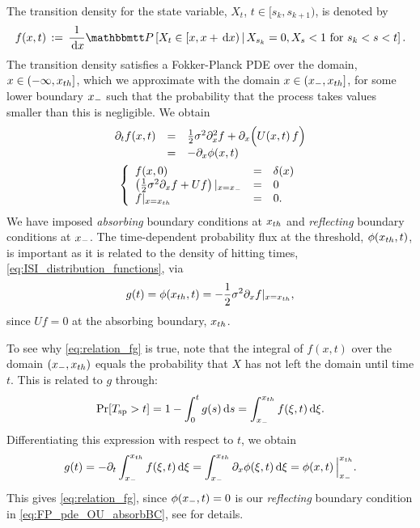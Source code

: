 The transition density for the state variable, $X_t$, $t \in [s_k, s_{k+1})$, is denoted by
\begin{equation}
f(x,t)  \, := \, \frac{1}{\intd{x} }\Prob \left[X_{t} \in [x, x+ \intd{x})  \,|\,
 X_{s_k} = 0, X_{s} < 1  \mbox{ for } s_k < s < t \right]  .
 \label{eq:transition_distribution}
\end{equation} 
The transition density satisfies a Fokker-Planck PDE over the domain, $x \in
(-\infty, { x_{th} }]$, which we approximate with the domain $x \in
({ x_{-} }, { x_{th} }]$, for some lower boundary ${ x_{-} }$ such that the
probability that the process takes values smaller than this is negligible. We
obtain
\begin{equation}
\begin{gathered}
\begin{array}{lcl}
	{\partial}_t f (x,t) &=&	\frac{1 }{2}\sigma^2  {\partial}^2_x f +
					{\partial}_x  \Big( U(x,t) \, f \Big)
					\\
					&=&
					- {\partial}_x \phi(x,t)
					\end{array}
	\\
	\left\{ \begin{array}{lcl}
	 f (x,0) &=& \delta(x)
	\\
	\left( \frac{1 }{2}\sigma^2 {\partial}_xf + U f \right) |_{x={ x_{-} }} &=& 0 
	\\
	f |_{x={ x_{th} }} &=& 0.
	\end{array} \right.
\label{eq:FP_pde_OU_absorbBC}
\end{gathered}
\end{equation}
We have imposed {\em absorbing} boundary conditions at ${ x_{th} }$ and {\em
reflecting} boundary conditions at ${ x_{-} }$.  The time-dependent probability flux at the
threshold, $\phi({ x_{th} }, t)$, is important as it is related to the density of hitting times,
\cref{eq:ISI_distribution_functions}, via 
\begin{equation}
\label{eq:relation_fg}
g(t)  = \phi({ x_{th} }, t) = -\frac{1 }{2}\sigma^2 {\partial}_x
f|_{x={ x_{th} }},
\end{equation}
since $U f = 0$ at the absorbing boundary, ${ x_{th} }$. 

To see why \cref{eq:relation_fg} is true, note that the integral of $f(x,t)$
over the domain $({ x_{-} }, { x_{th} })$ equals the probability that $X$ has
not left the domain until time $t$. This is related to $g$ through: 
$$\Pr[{ T_{\textrm{sp} } }>t] = 1-\int_0^tg(s) \, \mathrm{d} s = \int_{{ x_{-} }}^{ x_{th} } f(\xi, t)
\, \mathrm{d} \xi.$$ Differentiating this expression with respect to $t$, we obtain
$$g(t)   = -{\partial}_t \int_{{ x_{-} }}^{ x_{th} } f(\xi, t) \, \mathrm{d} \xi =
\int_{{ x_{-} }}^{ x_{th} } {\partial}_x \phi(\xi, t) \, \mathrm{d} \xi = \phi(x, t)
\, \Big|_{{ x_{-} }}^{{ x_{th} }}.$$
This gives \cref{eq:relation_fg}, since $\phi({ x_{-} }, t)=0$ is our {\em
reflecting} boundary condition in \cref{eq:FP_pde_OU_absorbBC}, see
\cite{tuckwell} for details. 

